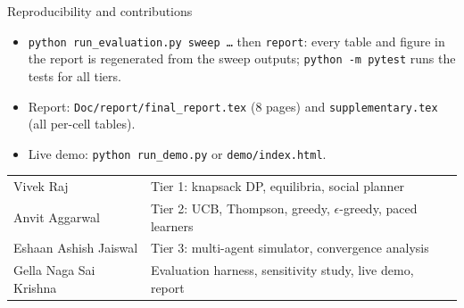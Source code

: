 \documentclass[aspectratio=169,11pt]{beamer}
\begin{document}
\begin{frame}{Reproducibility and contributions}
  \small
  \begin{itemize}
    \item \texttt{python run\_evaluation.py sweep \dots} then \texttt{report}: every table and
          figure in the report is regenerated from the sweep outputs; \texttt{python -m pytest}
          runs the tests for all tiers.
    \item Report: \texttt{Doc/report/final\_report.tex} (8 pages) and \texttt{supplementary.tex} (all per-cell tables).
    \item Live demo: \texttt{python run\_demo.py} or \texttt{demo/index.html}.
  \end{itemize}
  \vspace{0.4em}
  \begin{tabular}{@{}ll@{}}
    \toprule
    Vivek Raj & Tier 1: knapsack DP, equilibria, social planner \\
    Anvit Aggarwal & Tier 2: UCB, Thompson, greedy, $\epsilon$-greedy, paced learners \\
    Eshaan Ashish Jaiswal & Tier 3: multi-agent simulator, convergence analysis \\
    Gella Naga Sai Krishna & Evaluation harness, sensitivity study, live demo, report \\
    \bottomrule
  \end{tabular}
\end{frame}
\end{document}
